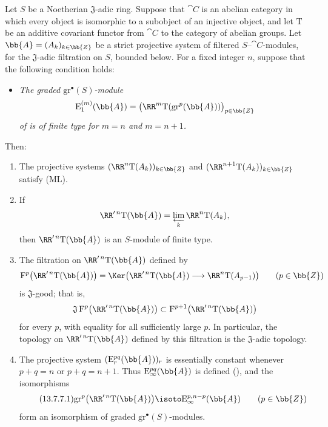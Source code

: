 \begin{proposition}[13.7.7]
\label{0.13.7.7}
Let $S$ be a Noetherian $\mathfrak{J}$-adic ring.
Suppose that $\cat{C}$ is an abelian category in which every object
is isomorphic to a subobject of an injective object, and let
$\mathrm{T}$ be an additive covariant functor from $\cat{C}$ to the
category of abelian groups.
Let $\bb{A}=(A_k)_{k\in\bb{Z}}$ be a
strict projective system of filtered $S$--$\cat{C}$-modules, for the $\mathfrak{J}$-adic
filtration on $S$, bounded below.
For a fixed integer $n$, suppose that the following condition holds:
\begin{itemize}
  \item[$(\mathrm{F}_n)$]
  \emph{The graded $\mathrm{gr}^\bullet(S)$-module}
  \[
    \mathrm{E}_1^{(m)}(\bb{A})
    =
    \bigl(
      \RR^m\mathrm{T}(\mathrm{gr}^p(\bb{A}))
    \bigr)_{p\in\bb{Z}}
  \]
  \emph{of  is of finite type for
  $m=n$ and $m=n+1$.}
\end{itemize}
Then:
\begin{enumerate}
  \item[{\rm(i)}] The projective systems
  $(\RR^n\mathrm{T}(A_k))_{k\in\bb{Z}}$ and
  $(\RR^{n+1}\mathrm{T}(A_k))_{k\in\bb{Z}}$ satisfy {\rm(ML)}.
  \item[{\rm(ii)}] If
  \[
    \RR'^{\,n}\mathrm{T}(\bb{A})
    =
    \varprojlim_k\RR^n\mathrm{T}(A_k),
  \]
  then $\RR'^{\,n}\mathrm{T}(\bb{A})$ is an $S$-module of finite
  type.
  \item[{\rm(iii)}] The filtration on
  $\RR'^{\,n}\mathrm{T}(\bb{A})$ defined by
  \[
    \mathrm{F}^p\bigl(\RR'^{\,n}\mathrm{T}(\bb{A})\bigr)
    =
    \Ker\bigl(
      \RR'^{\,n}\mathrm{T}(\bb{A})
      \longrightarrow
      \RR^n\mathrm{T}(A_{p-1})
    \bigr)
    \qquad(p\in\bb{Z})
  \]
  is $\mathfrak{J}$-good; that is,
  \[
    \mathfrak{J}\,
    \mathrm{F}^p\bigl(\RR'^{\,n}\mathrm{T}(\bb{A})\bigr)
    \subset
    \mathrm{F}^{p+1}\bigl(\RR'^{\,n}\mathrm{T}(\bb{A})\bigr)
  \]
  for every $p$, with equality for all sufficiently large $p$.
  In particular, the topology on
  $\RR'^{\,n}\mathrm{T}(\bb{A})$ defined by this filtration is the
  $\mathfrak{J}$-adic topology.
  \item[{\rm(iv)}] The projective system
  $(\mathrm{E}_r^{pq}(\bb{A}))_r$ is essentially constant whenever
  $p+q=n$ or $p+q=n+1$.
  Thus $\mathrm{E}_\infty^{pq}(\bb{A})$ is defined
  (), and the isomorphisms
  \begin{equation}
  \label{0.13.7.7.1}
  \tag{13.7.7.1}
    \mathrm{gr}^p\bigl(\RR'^{\,n}\mathrm{T}(\bb{A})\bigr)
    \isoto
    \mathrm{E}_\infty^{p,n-p}(\bb{A})
    \qquad(p\in\bb{Z})
  \end{equation}
  form an isomorphism of graded
  $\mathrm{gr}^\bullet(S)$-modules.
\end{enumerate}
\end{proposition}


